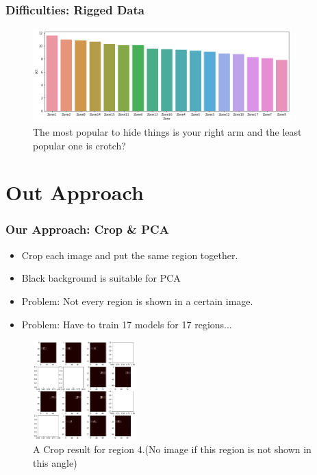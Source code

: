 \documentclass{beamer}
\begin{document}
\begin{frame}
\frametitle{Difficulties: Rigged Data}
	\begin{figure}
		\centering
		\includegraphics[width=10cm]{../Pic/bars.png}
		\caption{The most popular to hide things is your right arm and the least popular one is crotch?}
	\end{figure}	
\end{frame}


\section{Out Approach} %

\begin{frame}
\frametitle{Our Approach: Crop \& PCA}
	\begin{itemize}
		\item Crop each image and put the same region together.
		\item Black background is suitable for PCA
		\item Problem: Not every region is shown in a certain image.
		\item Problem: Have to train 17 models for 17 regions...
	\end{itemize}
	\begin{figure}
		\centering
		\includegraphics[width=4cm]{../Pic/cropped.png}
		\caption{A Crop result for region 4.(No image if this region is not shown in this angle)}
	\end{figure}
\end{frame}
\end{document}
